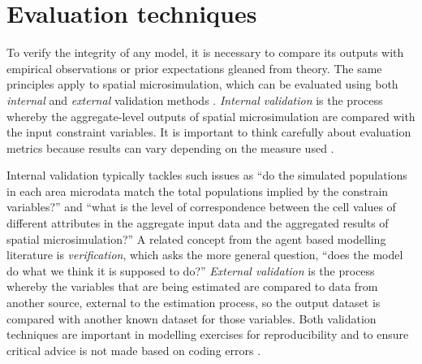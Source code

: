 \documentclass[a4paper,10pt]{article}
\providecommand{\DIFaddbegin}{} %
\providecommand{\DIFaddend}{} %
\begin{document}


\section{Evaluation techniques} \DIFaddbegin \label{seval}
\DIFaddend %
To verify the integrity of any model, it is necessary to compare its outputs
with empirical observations or prior expectations gleaned from theory.
The same principles apply to spatial microsimulation, which can be evaluated using
both \emph{internal} and \emph{external} validation methods \citep{Edwards2009}.
\emph{Internal validation} is the process whereby
the aggregate-level outputs of spatial microsimulation are compared with
the input constraint variables. It is important to think carefully about
evaluation metrics because results can vary depending on the measure used
\citep{Voas2001}.

Internal validation typically tackles such issues
as ``do the simulated populations in each area
microdata match the total populations implied by the constrain variables?''
and ``what is the level of correspondence between the cell values of different
attributes in the aggregate input data and the aggregated results of spatial microsimulation?''
A related concept from the agent based modelling literature is
\emph{verification}, which asks the more general question,
``does the model
do what we think it is supposed to do?'' \citep[p.~131]{ormerod2009validation}
\emph{External validation} is the process whereby the variables that are
being estimated are compared to data from another source,
external to the estimation process, so the output dataset is compared with
another known dataset for those variables.
Both validation techniques are important in modelling exercises for reproducibility and to ensure critical advice is not made
based on coding errors \citep{ormerod2009validation}.
\end{document}
